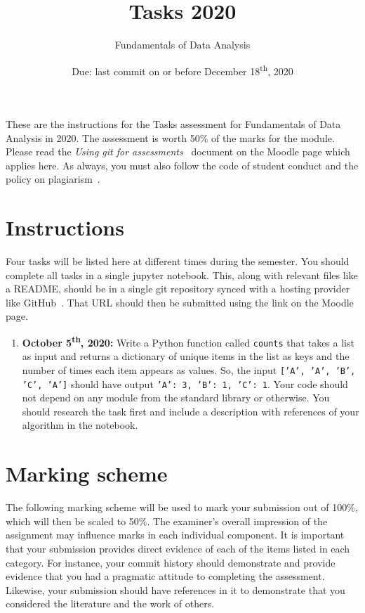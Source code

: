 \documentclass[a4paper, 12pt]{scrartcl}
\title{\vspace{-20mm}Tasks 2020}
\author{Fundamentals of Data Analysis}
\date{Due: last commit on or before December 18\textsuperscript{th}, 2020\vspace{-6mm}}
\begin{document}
  
  
  \maketitle

  These are the instructions for the Tasks assessment for Fundamentals of Data Analysis in 2020.
  The assessment is worth 50\% of the marks for the module.
  Please read the \emph{Using git for assessments}~\cite{usinggit} document on the Moodle page which applies here.
  As always, you must also follow the code of student conduct and the policy on plagiarism~\cite{gmitqaf}.

  \section*{Instructions}
  Four tasks will be listed here at different times during the semester.
  You should complete all tasks in a single jupyter notebook.
  This, along with relevant files like a README, should be in a single git repository synced with a hosting provider like GitHub~\cite{github}.
  That URL should then be submitted using the link on the Moodle page.

  \begin{enumerate}
    \item
      \textbf{October 5\textsuperscript{th}, 2020:}
      Write a Python function called \texttt{counts} that takes a list as input and returns a dictionary of unique items in the list as keys and the number of times each item appears as values.
      So, the input \texttt{['A', 'A', 'B', 'C', 'A']} should have output \texttt{{'A': 3, 'B': 1, 'C': 1}}.
      Your code should not depend on any module from the standard library or otherwise.
      You should research the task first and include a description with references of your algorithm in the notebook.
  \end{enumerate}


\newpage

\section*{Marking scheme}
  The following marking scheme will be used to mark your submission out of 100\%, which will then be scaled to 50\%.
  The examiner's overall impression of the assignment may influence marks in each individual component.
  It is important that your submission provides direct evidence of each of the items listed in each category.
  For instance, your commit history should demonstrate and provide evidence that you had a pragmatic attitude to completing the assessment.
  Likewise, your submission should have references in it to demonstrate that you considered the literature and the work of others.
\end{document}
